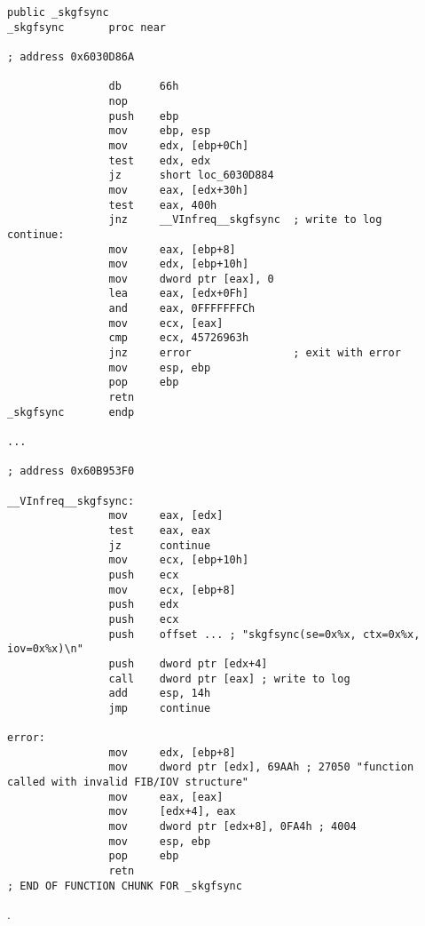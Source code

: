 \begin{lstlisting}[caption=orageneric11.dll (win32)]
                public _skgfsync
_skgfsync       proc near

; address 0x6030D86A

                db      66h
                nop
                push    ebp
                mov     ebp, esp
                mov     edx, [ebp+0Ch]
                test    edx, edx
                jz      short loc_6030D884
                mov     eax, [edx+30h]
                test    eax, 400h
                jnz     __VInfreq__skgfsync  ; write to log
continue:
                mov     eax, [ebp+8]
                mov     edx, [ebp+10h]
                mov     dword ptr [eax], 0
                lea     eax, [edx+0Fh]
                and     eax, 0FFFFFFFCh
                mov     ecx, [eax]
                cmp     ecx, 45726963h
                jnz     error                ; exit with error
                mov     esp, ebp
                pop     ebp
                retn
_skgfsync       endp

...

; address 0x60B953F0

__VInfreq__skgfsync:
                mov     eax, [edx]
                test    eax, eax
                jz      continue
                mov     ecx, [ebp+10h]
                push    ecx
                mov     ecx, [ebp+8]
                push    edx
                push    ecx
                push    offset ... ; "skgfsync(se=0x%x, ctx=0x%x, iov=0x%x)\n"
                push    dword ptr [edx+4]
                call    dword ptr [eax] ; write to log
                add     esp, 14h
                jmp     continue

error:
                mov     edx, [ebp+8]
                mov     dword ptr [edx], 69AAh ; 27050 "function called with invalid FIB/IOV structure"
                mov     eax, [eax]
                mov     [edx+4], eax
                mov     dword ptr [edx+8], 0FA4h ; 4004
                mov     esp, ebp
                pop     ebp
                retn
; END OF FUNCTION CHUNK FOR _skgfsync
\end{lstlisting}

.

